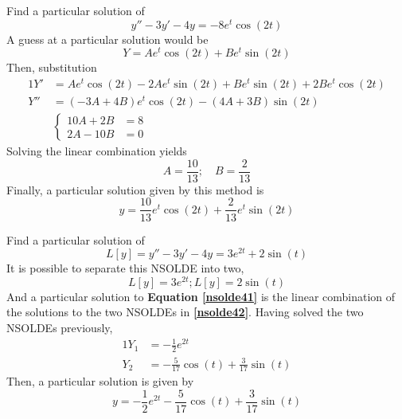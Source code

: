 \documentclass[twoside]{report}
\begin{document}
    \begin{example}
        Find a particular solution of
        \begin{equation}
            y'' - 3y' -4y = -8e^{t}\cos(2t)
        \end{equation}
        A guess at a particular solution would be
        \begin{equation}
            Y = Ae^{t}\cos(2t) + Be^{t}\sin(2t)
        \end{equation}
        Then, substitution
        \begin{alignat}{1}
            Y' &= Ae^{t}\cos(2t)-2Ae^{t}\sin(2t) + Be^{t}\sin(2t) + 2Be^{t}\cos(2t)\\
            Y'' &= (-3A + 4B)e^{t}\cos(2t) - (4A + 3B)\sin(2t)\\
            & \begin{cases}
                10A + 2B &= 8\\
                2A-10B &= 0
            \end{cases}
        \end{alignat}
        Solving the linear combination yields
        \begin{equation}
            A = \frac{10}{13};\quad B = \frac{2}{13}
        \end{equation}
        Finally, a particular solution given by this method is
        \begin{equation}
            y = \frac{10}{13}e^{t}\cos(2t) + \frac{2}{13}e^{t}\sin(2t)
        \end{equation}
    \end{example}
    \np
    \begin{example}
        Find a particular solution of
        \begin{equation}
            \label{nsolde41}
            L[y] = y'' -3y' -4y = 3e^{2t} + 2\sin(t)
        \end{equation}
        It is possible to separate this NSOLDE into two,
        \begin{equation}
            \label{nsolde42}
            L[y] = 3e^{2t}; L[y] = 2\sin(t)
        \end{equation}
        And a particular solution to \textbf{Equation \ref{nsolde41}} is the linear combination of the solutions to the two NSOLDEs in \textbf{\ref{nsolde42}}.
        Having solved the two NSOLDEs previously,
        \begin{alignat}{1}
            Y_{1} &= -\frac{1}{2}e^{2t}\\
            Y_{2} &= -\frac{5}{17}\cos(t) + \frac{3}{17}\sin(t)
        \end{alignat}
        Then, a particular solution is given by
        \begin{equation}
            y = -\frac{1}{2}e^{2t} -\frac{5}{17}\cos(t) + \frac{3}{17}\sin(t)
        \end{equation}
    \end{example}
\end{document}
